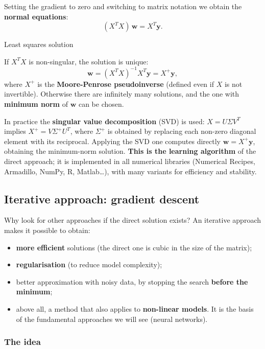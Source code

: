 Setting the gradient to zero and switching to matrix notation we obtain
the \textbf{normal equations}: \[
(X^T X)\,\mathbf{w} = X^T \mathbf{y}.
\]

\begin{boxtheorem}{Least squares solution}

If \(X^TX\) is non-singular, the solution is unique: \[
\mathbf{w} = (X^TX)^{-1}X^T\mathbf{y} = X^+\mathbf{y},
\] where \(X^+\) is the \textbf{Moore-Penrose pseudoinverse} (defined
even if \(X\) is not invertible). Otherwise there are infinitely many
solutions, and the one with \textbf{minimum norm} of \(\mathbf{w}\) can
be chosen.

\end{boxtheorem}

In practice the \textbf{singular value decomposition} (SVD) is used:
\(X = U\Sigma V^T\) implies \(X^+ = V\Sigma^+U^T\), where \(\Sigma^+\)
is obtained by replacing each non-zero diagonal element with its
reciprocal. Applying the SVD one computes directly
\(\mathbf{w} = X^+\mathbf{y}\), obtaining the minimum-norm solution.
\textbf{This is the learning algorithm} of the direct approach; it is
implemented in all numerical libraries (Numerical Recipes, Armadillo,
NumPy, R, Matlab\ldots), with many variants for efficiency and
stability.

\subsection{Iterative approach: gradient
descent}\label{approccio-iterativo-la-discesa-del-gradiente}

Why look for other approaches if the direct solution exists? An
iterative approach makes it possible to obtain:

\begin{itemize}
\tightlist
\item
  \textbf{more efficient} solutions (the direct one is cubic in the
  size of the matrix);
\item
  \textbf{regularisation} (to reduce model complexity);
\item
  better approximation with noisy data, by stopping the search
  \textbf{before the minimum};
\item
  above all, a method that also applies to \textbf{non-linear
  models}. It is the basis of the fundamental approaches we will see
  (neural networks).
\end{itemize}

\subsubsection{The idea}\label{lidea}

